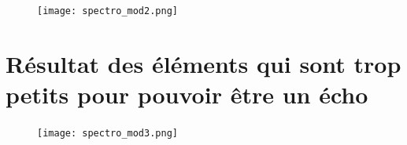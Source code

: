 \documentclass[11pt]{article}
\begin{document}
\begin{figure}[H]
    \begin{center}
        \texttt{[image: spectro\_mod2.png]}
    \end{center}
\end{figure}

\newpage

\section{Résultat des éléments qui sont trop petits pour pouvoir être un écho} \label{app:spectro-mod3}

\begin{figure}[h]
    \begin{center}
        \texttt{[image: spectro\_mod3.png]}
    \end{center}
\end{figure}








\end{document}
